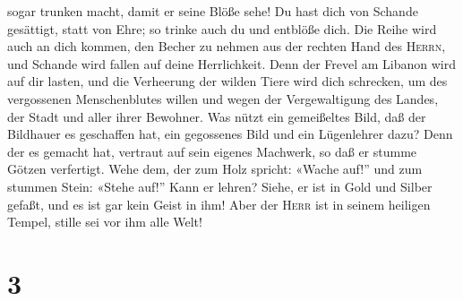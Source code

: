 sogar trunken macht, damit er seine Blöße sehe!  Du hast
dich von Schande gesättigt, statt von Ehre; so trinke auch du und
entblöße dich. Die Reihe wird auch an dich kommen, den Becher zu nehmen
aus der rechten Hand des \textsc{Herrn}, und Schande wird fallen auf
deine Herrlichkeit.  Denn der Frevel am Libanon wird auf
dir lasten, und die Verheerung der wilden Tiere wird dich schrecken, um
des vergossenen Menschenblutes willen und wegen der Vergewaltigung des
Landes, der Stadt und aller ihrer Bewohner.  Was nützt
ein gemeißeltes Bild, daß der Bildhauer es geschaffen hat, ein
gegossenes Bild und ein Lügenlehrer dazu? Denn der es gemacht hat,
vertraut auf sein eigenes Machwerk, so daß er stumme Götzen verfertigt.
 Wehe dem, der zum Holz spricht: «Wache auf!'' und zum
stummen Stein: «Stehe auf!'' Kann er lehren? Siehe, er ist in Gold und
Silber gefaßt, und es ist gar kein Geist in ihm!  Aber
der \textsc{Herr} ist in seinem heiligen Tempel, stille sei vor ihm alle
Welt!

\hypertarget{section-2}{%
\section{3}\label{section-2}}

